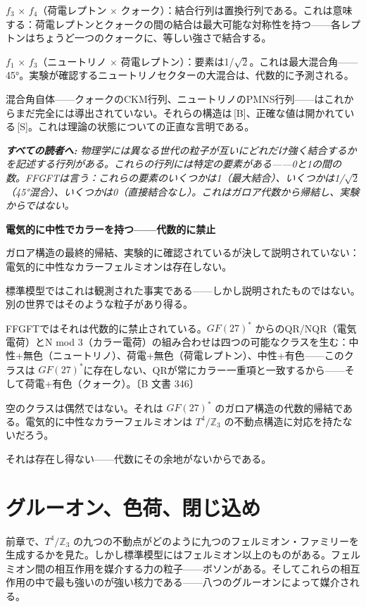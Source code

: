 \documentclass[11pt,openany]{book}
\newcommand{\status}[1]{\penalty10000\,{\tiny\textcolor{gray!70}{[#1]}}}
\newenvironment{laierspur}{%
  \par\vspace{4pt}%
  \noindent\small\itshape\color{blue!60!black}%
  \textbf{すべての読者へ:}\enspace\ignorespaces}{%
  \par\vspace{4pt}\normalsize\normalfont\normalcolor}
\begin{document}
$f_3$ × $f_4$（荷電レプトン $\times$ クォーク）：結合行列は置換行列である。これは意味する：荷電レプトンとクォークの間の結合は最大可能な対称性を持つ——各レプトンはちょうど一つのクォークに、等しい強さで結合する。

$f_1$ × $f_3$（ニュートリノ $\times$ 荷電レプトン）：要素は1/$\sqrt{2}$。これは最大混合角——45°。実験が確認するニュートリノセクターの大混合は、代数的に予測される。

混合角自体——クォークのCKM行列、ニュートリノのPMNS行列——はこれからまだ完全には導出されていない。それらの構造は\status{B}、正確な値は開かれている\status{S}。これは理論の状態についての正直な言明である。

\begin{laierspur}
物理学には異なる世代の粒子が互いにどれだけ強く結合するかを記述する行列がある。これらの行列には特定の要素がある——0と1の間の数。FFGFTは言う：これらの要素のいくつかは1（最大結合）、いくつかは1/$\sqrt{2}$（45°混合）、いくつかは0（直接結合なし）。これはガロア代数から帰結し、実験からではない。
\end{laierspur}

\textbf{電気的に中性でカラーを持つ——代数的に禁止}

ガロア構造の最終的帰結、実験的に確認されているが決して説明されていない：電気的に中性なカラーフェルミオンは存在しない。

標準模型ではこれは観測された事実である——しかし説明されたものではない。別の世界ではそのような粒子があり得る。

FFGFTではそれは代数的に禁止されている。$GF(27)^*$ からのQR/NQR（電気電荷）とN mod 3（カラー電荷）の組み合わせは四つの可能なクラスを生む：中性+無色（ニュートリノ）、荷電+無色（荷電レプトン）、中性+有色——このクラスは $GF(27)^*$に存在しない、QRが常にカラー一重項と一致するから——そして荷電+有色（クォーク）。〔B 文書 346〕

空のクラスは偶然ではない。それは $GF(27)^*$ のガロア構造の代数的帰結である。電気的に中性なカラーフェルミオンは $T^4/\mathbb{Z}_3$ の不動点構造に対応を持たないだろう。

それは存在し得ない——代数にその余地がないからである。

\medskip

\chapter{グルーオン、色荷、閉じ込め}

前章で、$T^4/\mathbb{Z}_3$ の九つの不動点がどのように九つのフェルミオン・ファミリーを生成するかを見た。しかし標準模型にはフェルミオン以上のものがある。フェルミオン間の相互作用を媒介する力の粒子——ボソンがある。そしてこれらの相互作用の中で最も強いのが強い核力である——八つのグルーオンによって媒介される。
\end{document}
